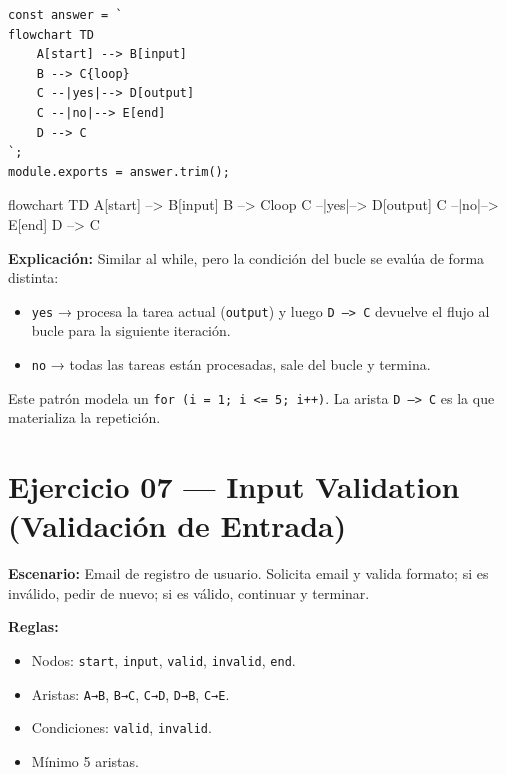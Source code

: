 \documentclass[10pt,a4paper]{article}
\newenvironment{mermaid}[1][]
  {%
   \begin{mdframed}[%
     linecolor=blue!50!black,
     backgroundcolor=blue!3,
     innertopmargin=6pt,
     innerbottommargin=6pt,
     leftmargin=0pt,
     rightmargin=0pt,
     skipabove=10pt,
     skipbelow=10pt,
     frametitle={Diagrama Mermaid},
     frametitlefont={\small\bfseries\color{blue!70!black}},
   ]%
   \small\ttfamily
  }
  {%
   \end{mdframed}%
  }
\begin{document}
\begin{lstlisting}[style=jsstyle]
const answer = `
flowchart TD
    A[start] --> B[input]
    B --> C{loop}
    C --|yes|--> D[output]
    C --|no|--> E[end]
    D --> C
`;
module.exports = answer.trim();
\end{lstlisting}

\begin{mermaid}
flowchart TD
    A[start] --> B[input]
    B --> C{loop}
    C --|yes|--> D[output]
    C --|no|--> E[end]
    D --> C
\end{mermaid}

\textbf{Explicación:}
Similar al while, pero la condición del bucle se evalúa de forma
distinta:
\begin{itemize}
  \item \texttt{yes} → procesa la tarea actual (\texttt{output}) y
        luego \texttt{D --> C} devuelve el flujo al bucle para la
        siguiente iteración.
  \item \texttt{no} → todas las tareas están procesadas, sale del
        bucle y termina.
\end{itemize}

Este patrón modela un \texttt{for (i = 1; i <= 5; i++)}. La arista
\texttt{D --> C} es la que materializa la repetición.

\newpage

\section{Ejercicio 07 — Input Validation (Validación de Entrada)}

\textbf{Escenario:} Email de registro de usuario. Solicita email y
valida formato; si es inválido, pedir de nuevo; si es válido, continuar
y terminar.

\textbf{Reglas:}
\begin{itemize}
  \item Nodos: \texttt{start}, \texttt{input}, \texttt{valid},
        \texttt{invalid}, \texttt{end}.
  \item Aristas: \texttt{A→B}, \texttt{B→C}, \texttt{C→D},
        \texttt{D→B}, \texttt{C→E}.
  \item Condiciones: \texttt{valid}, \texttt{invalid}.
  \item Mínimo 5 aristas.
\end{itemize}
\end{document}
